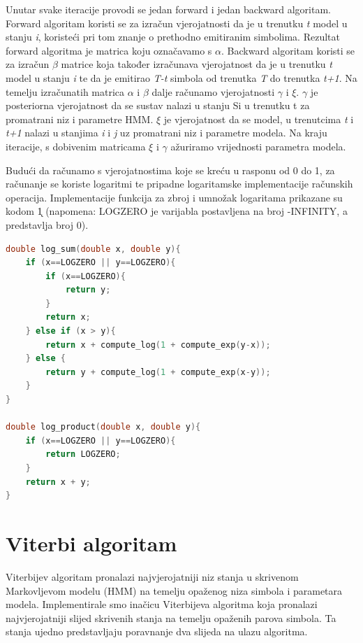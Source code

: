 \documentclass[times, utf8, seminar, numeric]{fer}
\begin{document}
\bigskip
Unutar svake iteracije provodi se jedan forward i jedan backward algoritam. 
Forward algoritam koristi se za izračun vjerojatnosti da je u trenutku \textit{t}   model u stanju \textit{i}, 
koristeći pri tom znanje o prethodno emitiranim simbolima. 
Rezultat forward algoritma je matrica koju označavamo s $\alpha$. 
Backward algoritam koristi se za izračun $\beta$ matrice koja također izračunava vjerojatnost da je u trenutku \textit{t} model u stanju \textit{i} te da je emitirao \textit{T-t} simbola od trenutka \textit{T} do trenutka \textit{t+1}. Na temelju izračunatih matrica $\alpha$ i $\beta$ dalje računamo vjerojatnosti $\gamma$ i $\xi$. $\gamma$ je posteriorna vjerojatnost da se sustav nalazi u stanju Si u trenutku t za promatrani niz i parametre HMM. $\xi$ je vjerojatnost da se model, u trenutcima \textit{t}  i \textit{t+1} nalazi u stanjima \textit{i} i \textit{j} uz promatrani niz i parametre modela. Na kraju iteracije, s dobivenim matricama $\xi$ i $\gamma$ ažuriramo vrijednosti parametra modela.

\bigskip
Budući da računamo s vjerojatnostima koje se kreću u rasponu od 0 do 1, za računanje se koriste logaritmi te pripadne logaritamske implementacije računskih operacija.
Implementacije funkcija za zbroj i umnožak logaritama prikazane su kodom \k1 (napomena: LOGZERO je varijabla postavljena na broj -INFINITY, a predstavlja broj 0).


\begin{lstlisting}[language=C++, caption={Funkcije za računanje s logaritamskih vrijednostima}, captionpos=b, label={k1}]
double log_sum(double x, double y){
	if (x==LOGZERO || y==LOGZERO){
		if (x==LOGZERO){
			return y;
		} 
		return x;
	} else if (x > y){
		return x + compute_log(1 + compute_exp(y-x));
	} else {
		return y + compute_log(1 + compute_exp(x-y));
	}
}

double log_product(double x, double y){
	if (x==LOGZERO || y==LOGZERO){
		return LOGZERO;
	}
	return x + y;
}
\end{lstlisting}



\section{Viterbi algoritam}
Viterbijev algoritam pronalazi najvjerojatniji niz stanja u skrivenom Markovljevom modelu (HMM) na temelju opaženog niza simbola i parametara modela. Implementirale smo inačicu Viterbijeva algoritma koja pronalazi najvjerojatniji slijed skrivenih stanja na temelju opaženih parova simbola. Ta stanja ujedno predstavljaju poravnanje dva slijeda na ulazu algoritma. 
\end{document}
